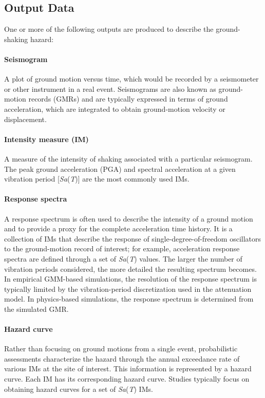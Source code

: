 \subsection{Output Data}

\noindent One or more of the following outputs are produced to describe the ground-shaking hazard:

\paragraph{Seismogram} A plot of ground motion versus time, which would be recorded by a seismometer or other instrument in a real event. Seismograms are also known as ground-motion records (GMRs) and are typically expressed in terms of ground acceleration, which are integrated to obtain ground-motion velocity or displacement.  

\paragraph{Intensity measure (IM)} A measure of the intensity of shaking associated with a particular seismogram. The peak ground acceleration (PGA) and spectral acceleration at a given vibration period [\textit{Sa}(\textit{T})] are the most commonly used IMs.

\paragraph{Response spectra} A response spectrum is often used to describe the intensity of a ground motion and to provide a proxy for the complete acceleration time history. It is a collection of IMs that describe the response of single-degree-of-freedom oscillators to the ground-motion record of interest; for example, acceleration response spectra are defined through a set of \textit{Sa}(\textit{T}) values. The larger the number of vibration periods considered, the more detailed the resulting spectrum becomes. In empirical GMM-based simulations, the resolution of the response spectrum is typically limited by the vibration-period discretization used in the attenuation model. In physics-based simulations, the response spectrum is determined from the simulated GMR.

\paragraph{Hazard curve} Rather than focusing on ground motions from a single event, probabilistic assessments characterize the hazard through the annual exceedance rate of various IMs at the site of interest. This information is represented by a hazard curve. Each IM has its corresponding hazard curve. Studies typically focus on obtaining hazard curves for a set of \textit{Sa}(\textit{T}) IMs. 


